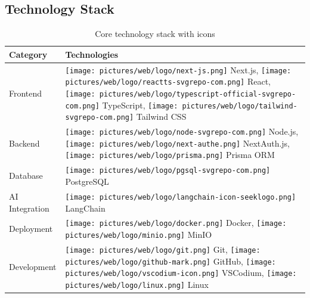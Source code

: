 \subsection{Technology Stack}

\begin{table}[H]
    \centering
    \begin{tabular}{|p{3cm}|p{8cm}|}
        \hline
        \textbf{Category} & \textbf{Technologies} \\ \hline
        
         Frontend & 
        \texttt{[image: pictures/web/logo/next-js.png]} Next.js, 
        \texttt{[image: pictures/web/logo/reactts-svgrepo-com.png]} React, 
        \texttt{[image: pictures/web/logo/typescript-official-svgrepo-com.png]} TypeScript, \newline
        \texttt{[image: pictures/web/logo/tailwind-svgrepo-com.png]} Tailwind CSS \\ \hline
        
         Backend & 
        \texttt{[image: pictures/web/logo/node-svgrepo-com.png]} Node.js, 
        \texttt{[image: pictures/web/logo/next-authe.png]} NextAuth.js, \newline
        \texttt{[image: pictures/web/logo/prisma.png]} Prisma ORM \\ \hline
        
         Database & 
        \texttt{[image: pictures/web/logo/pgsql-svgrepo-com.png]} PostgreSQL \\ \hline
        
         AI Integration & 
        \texttt{[image: pictures/web/logo/langchain-icon-seeklogo.png]} LangChain \\ \hline
        
         Deployment & 
        \texttt{[image: pictures/web/logo/docker.png]} Docker, 
        \texttt{[image: pictures/web/logo/minio.png]} MinIO \\ \hline
        
         Development & 
        \texttt{[image: pictures/web/logo/git.png]} Git, 
        \texttt{[image: pictures/web/logo/github-mark.png]} GitHub, 
        \texttt{[image: pictures/web/logo/vscodium-icon.png]} VSCodium, \newline
        \texttt{[image: pictures/web/logo/linux.png]} Linux \\ \hline
    \end{tabular}
    \caption{Core technology stack with icons}
\end{table}

